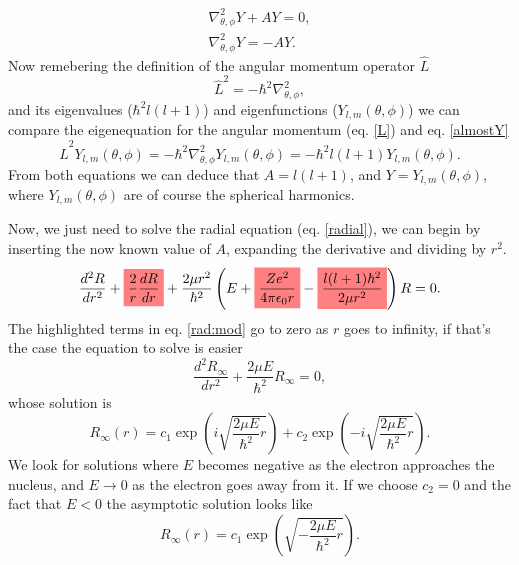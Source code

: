 \begin{questions}
\begin{solution}
\begin{eqnarray}
    \nabla^2_{\theta,\phi} Y  + AY = 0, \nonumber \\
    \nabla^2_{\theta,\phi} Y = -AY.
    \label{almostY}
  \end{eqnarray}
  Now remebering the definition of the angular momentum operator $\hat{L}$
  \begin{equation*}
    \hat{L}^2 = -\hbar^2 \nabla^2_{\theta,\phi},
  \end{equation*}
  and its eigenvalues ($\hbar^2 l (l+1)$) and eigenfunctions ($Y_{l,m}(\theta,\phi)$) we can compare the eigenequation for the angular momentum (eq. \ref{L}) and eq. \ref{almostY}
  \begin{equation}
    \hat{L}^2 Y_{l,m}(\theta,\phi)= -\hbar^2 \nabla^2_{\theta,\phi} Y_{l,m}(\theta,\phi) = - \hbar^2 l (l+1) Y_{l,m}(\theta,\phi).
    \label{L}
  \end{equation}
  From both equations we can deduce that $A = l(l+1)$, and $Y = Y_{l,m}(\theta,\phi) $, where $Y_{l,m}(\theta,\phi)$ are of course the spherical harmonics.

  Now, we just need to solve the radial equation (eq. \ref{radial}), we can begin by inserting the now known value of $A$, expanding the derivative and dividing by $r^2$.
  \begin{eqnarray}
    \frac{d^2R}{dr^2} +\highlight{\frac{2}{r}\frac{dR}{dr}} + \frac{2\mu r^2}{\hbar^2}\left(E + \highlight{\frac{Ze^2}{4\pi\epsilon_0r }} - \highlight{\frac{l(l+1)\hbar^2}{2\mu r^2}} \right)R = 0.
    \label{rad:mod}
  \end{eqnarray}
  The highlighted terms in eq. \ref{rad:mod} go to zero as $r$ goes to infinity, if that's the case the equation to solve is easier
  \begin{equation}
    \frac{d^2R_\infty}{dr^2} + \frac{2\mu E}{\hbar^2}R_\infty = 0,
  \end{equation}
  whose solution is
  \begin{equation*}
    R_\infty(r) = c_1 \exp{\left(i\sqrt{\frac{2\mu E}{\hbar^2} r}\right)} + c_2 \exp{\left(-i\sqrt{\frac{2\mu E}{\hbar^2} r}\right)}.
  \end{equation*}
  We look for solutions where $E$ becomes negative as the electron approaches the nucleus, and $E\rightarrow0$ as the electron goes away from it. If we choose $c_2 = 0$ and the fact that $E<0$ the asymptotic solution looks like
  \begin{equation}
    R_\infty(r) = c_1 \exp{\left(\sqrt{-\frac{2\mu E}{\hbar^2} r}\right)} .
  \end{equation}
\end{solution}


\end{questions}
